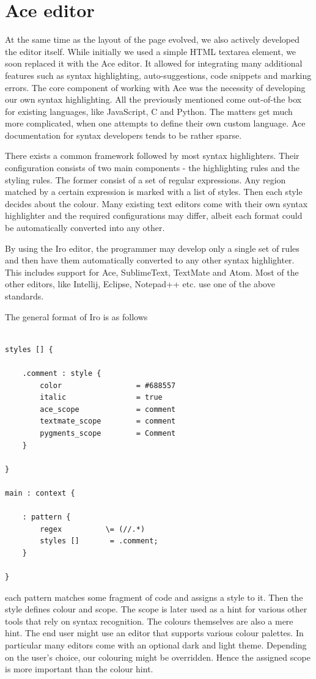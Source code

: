 \section{Ace editor}

At the same time as the layout of the page evolved, we also actively developed the editor itself. While initially we used a simple HTML textarea element, we soon replaced it with the Ace editor. It allowed for integrating many additional features such as syntax highlighting, auto-suggestions, code snippets and marking errors. The core component of working with Ace was the necessity of developing our own syntax highlighting. All the previously mentioned come out-of-the box for existing languages, like JavaScript, C and Python. The matters get much more complicated, when one attempts to define their own custom language. Ace documentation for syntax developers tends to be rather sparse. 

There exists a common framework followed by most syntax highlighters. Their configuration consists of two main components - the highlighting rules and the styling rules. The former consist of a set of regular expressions. Any region matched by a certain expression is marked with a list of styles. Then each style decides about the colour. Many existing text editors come with their own syntax highlighter and the required configurations may differ, albeit each format could be automatically converted into any other. 

By using the Iro editor, the programmer may develop only a single set of rules and then have them automatically converted to any other syntax highlighter. This includes support for Ace, SublimeText, TextMate and Atom. Most of the other editors, like Intellij, Eclipse, Notepad++ etc. use one of the above standards. 

The general format of Iro is as follows
\begin{lstlisting}

styles [] {
    
    .comment : style {
        color                 = #688557
        italic                = true
        ace_scope             = comment
        textmate_scope        = comment
        pygments_scope        = Comment
    }
    
}

main : context {
    
    : pattern {
        regex          \= (//.*)
        styles []       = .comment;
    }
    
}
\end{lstlisting}
each pattern matches some fragment of code and assigns a style to it. Then the style defines colour and scope. The scope is later used as a hint for various other tools that rely on syntax recognition. The colours themselves are also a mere hint. The end user might use an editor that supports various colour palettes. In particular many editors come with an optional dark and light theme. Depending on the user's choice, our colouring might be overridden. Hence the assigned scope is more important than the colour hint.

